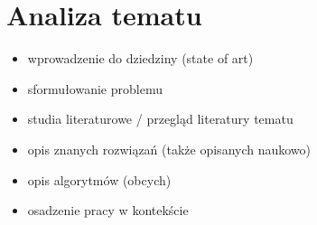 \chapter{Analiza tematu}
 {
\begin{itemize}
  \item wprowadzenie do dziedziny (state of art)
  \item sformułowanie problemu
  \item studia literaturowe / przegląd literatury tematu
  \item opis znanych rozwiązań (także opisanych naukowo)
  \item opis algorytmów (obcych)
  \item osadzenie pracy w kontekście
\end{itemize}
 }
